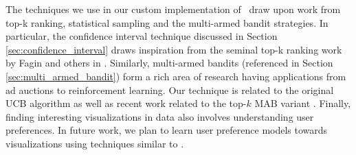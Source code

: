 


The techniques we use in our custom implementation of \VizRecDB\ draw upon work
from top-k ranking, statistical sampling and the multi-armed bandit strategies. 
In particular, the confidence interval technique discussed in Section
\ref{sec:confidence_interval} draws inspiration from the seminal top-k ranking
work by Fagin and others in \cite{DBLP:conf/pods/FaginLN01, DBLP:conf/vldb/IlyasAE04}.
Similarly, multi-armed bandits (referenced in Section
\ref{sec:multi_armed_bandit}) form 
a rich area of research having applications from ad auctions to reinforcement learning. 
Our technique is related to the original UCB algorithm \cite{AuerCF02, LaiR85}
as well as recent work related to the top-$k$ MAB variant \cite{BubeckWV13,
audibert2010best}.
Finally, finding interesting visualizations in data also involves understanding
user preferences. 
In future work, we plan to learn user preference models towards visualizations
using techniques similar to \cite{CHI:YangLZ14, IUIGotzW09}. 

